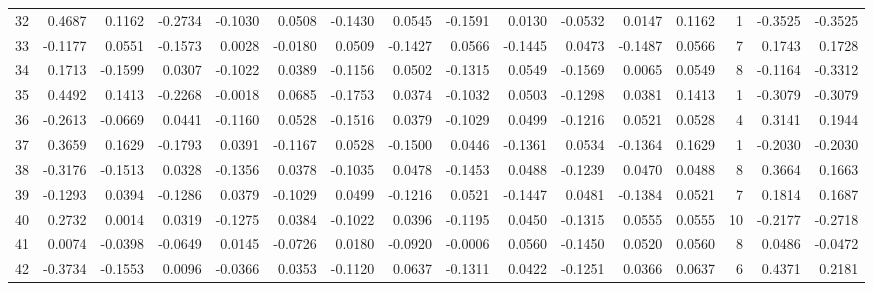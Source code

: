 \begin{tabular}{lrrrrrrrrrrrrrrr}
32  &      0.4687 &  0.1162 & -0.2734 & -0.1030 &  0.0508 & -0.1430 &  0.0545 & -0.1591 &  0.0130 & -0.0532 &   0.0147 &     0.1162 &      1 &                   -0.3525 &                    -0.3525 \\
33  &     -0.1177 &  0.0551 & -0.1573 &  0.0028 & -0.0180 &  0.0509 & -0.1427 &  0.0566 & -0.1445 &  0.0473 &  -0.1487 &     0.0566 &      7 &                    0.1743 &                     0.1728 \\
34  &      0.1713 & -0.1599 &  0.0307 & -0.1022 &  0.0389 & -0.1156 &  0.0502 & -0.1315 &  0.0549 & -0.1569 &   0.0065 &     0.0549 &      8 &                   -0.1164 &                    -0.3312 \\
35  &      0.4492 &  0.1413 & -0.2268 & -0.0018 &  0.0685 & -0.1753 &  0.0374 & -0.1032 &  0.0503 & -0.1298 &   0.0381 &     0.1413 &      1 &                   -0.3079 &                    -0.3079 \\
36  &     -0.2613 & -0.0669 &  0.0441 & -0.1160 &  0.0528 & -0.1516 &  0.0379 & -0.1029 &  0.0499 & -0.1216 &   0.0521 &     0.0528 &      4 &                    0.3141 &                     0.1944 \\
37  &      0.3659 &  0.1629 & -0.1793 &  0.0391 & -0.1167 &  0.0528 & -0.1500 &  0.0446 & -0.1361 &  0.0534 &  -0.1364 &     0.1629 &      1 &                   -0.2030 &                    -0.2030 \\
38  &     -0.3176 & -0.1513 &  0.0328 & -0.1356 &  0.0378 & -0.1035 &  0.0478 & -0.1453 &  0.0488 & -0.1239 &   0.0470 &     0.0488 &      8 &                    0.3664 &                     0.1663 \\
39  &     -0.1293 &  0.0394 & -0.1286 &  0.0379 & -0.1029 &  0.0499 & -0.1216 &  0.0521 & -0.1447 &  0.0481 &  -0.1384 &     0.0521 &      7 &                    0.1814 &                     0.1687 \\
40  &      0.2732 &  0.0014 &  0.0319 & -0.1275 &  0.0384 & -0.1022 &  0.0396 & -0.1195 &  0.0450 & -0.1315 &   0.0555 &     0.0555 &     10 &                   -0.2177 &                    -0.2718 \\
41  &      0.0074 & -0.0398 & -0.0649 &  0.0145 & -0.0726 &  0.0180 & -0.0920 & -0.0006 &  0.0560 & -0.1450 &   0.0520 &     0.0560 &      8 &                    0.0486 &                    -0.0472 \\
42  &     -0.3734 & -0.1553 &  0.0096 & -0.0366 &  0.0353 & -0.1120 &  0.0637 & -0.1311 &  0.0422 & -0.1251 &   0.0366 &     0.0637 &      6 &                    0.4371 &                     0.2181 \\

\end{tabular}
